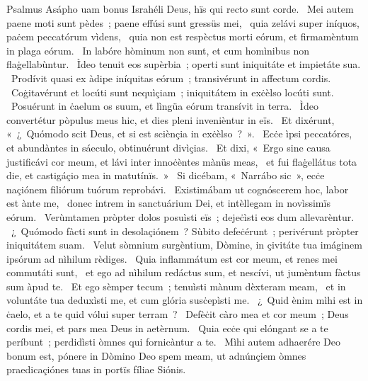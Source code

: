 { Psalmus Asápho}
{%
uam bonus Israhéli Deus, hïs qui recto sunt corde. 
~Mei autem paene moti sunt pèdes~; paene effúsi sunt gressüs mei, 
~quia zelávi super iníquos, paċem peccatórum vìdens, 
~quia non est respèctus morti eórum, et firmamèntum in plaga eórum. 
~In labóre hòminum non sunt, et cum homìnibus non flaġellabùntur. 
~Ìdeo tenuit eos supèrbia~; operti sunt iniquitáte et impietáte sua. 
~Prodívit quasi ex àdipe iníquitas eórum~; transivérunt in affectum cordis. 
~Coġitavérunt et locúti sunt nequìçiam~; iniquitátem in exċèlso locúti sunt. 
~Posuérunt in ċaelum os suum, et lìngüa eórum transívit in terra. 
~Ìdeo convertétur pòpulus meus hic, et dies pleni invenièntur in eïs. 
~Et dixérunt, «~¿~Quómodo scit Deus, et si est sciènçia in exċèlso~?~». 
~Ecċe ìpsi peccatóres, et abundàntes in sáeculo, obtinuérunt divìçias. 
~Et dixi, «~Ergo sine causa justificávi cor meum, et lávi inter innoċèntes mànüs meas, 
~et fui flaġellátus tota die, et castigáçio mea in matutínïs.~»
~Si dicébam, «~Narrábo sic~», ecċe naçiónem filiórum tuórum reprobávi. 
~Existimábam ut cognóscerem hoc, labor est ànte me, 
~donec intrem in sanctuárium Dei, et intèllegam in novìssimïs eórum. 
~Verùmtamen pròpter dolos posuìsti eïs~; dejeċìsti eos dum allevarèntur. 
~¿~Quómodo fàcti sunt in desolaçiónem~? Sùbito defeċérunt~; perivérunt pròpter iniquitátem suam. 
~Velut sòmnium surgèntium, Dòmine, in çivitáte tua imáginem ipsórum ad nìhilum rèdiges. 
~Quia inflammátum est cor meum, et renes mei commutáti sunt, 
~et ego ad nìhilum redáctus sum, et nescívi, ut jumèntum fàctus sum àpud te. 
~Et ego sèmper tecum~; tenuìsti mànum dèxteram meam, 
~et in voluntáte tua deduxìsti me, et cum glória susċepìsti me. 
~¿~Quid ènim mìhi est in ċaelo, et a te quid vólui super terram~? 
~Defèċit càro mea et cor meum~; Deus cordis mei, et pars mea Deus in aetèrnum. 
~Quia ecċe qui elóngant se a te períbunt~; perdidìsti òmnes qui fornicàntur a te. 
~Mìhi autem adhaerére Deo bonum est, pónere in Dòmino Deo spem meam, ut adnúnçiem òmnes praedicaçiónes tuas in portïs fíliae Siónis. 
}
